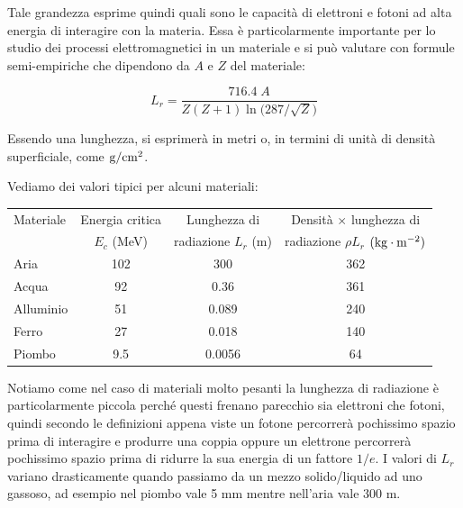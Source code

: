 Tale grandezza esprime quindi quali sono le capacità di elettroni e fotoni ad alta energia di interagire con la materia. Essa è particolarmente importante per lo studio dei processi elettromagnetici in un materiale e si può valutare con formule semi-empiriche che dipendono da $A$ e $Z$ del materiale:

\begin{equation*}
    L_r=\frac{716.4 \; A}{Z(Z+1)\ln \bigl( 287/\sqrt{Z} \bigr)}
\end{equation*}

Essendo una lunghezza, si esprimerà in metri o, in termini di unità di densità superficiale, come $\rm g/cm^2$.

Vediamo dei valori tipici per alcuni materiali:

\begin{center}
    \begin{tabular}{|l|c|c|c|}
      \hline
      Materiale & Energia critica & Lunghezza di & Densità $\times$ lunghezza di\\
      & $E_c$ (MeV) & radiazione $L_r$ (m) & radiazione $\rho L_r$ $(\rm kg \cdot m^{-2})$\\
      \hline
      Aria & 102 & 300 & 362\\
      \hline
      Acqua & 92 & 0.36 & 361\\
      \hline
      Alluminio & 51 & 0.089 & 240\\
      \hline
      Ferro & 27 & 0.018 & 140\\
      \hline
      Piombo & 9.5 & 0.0056 & 64\\
      \hline
    \end{tabular}
  \end{center}

Notiamo come nel caso di materiali molto pesanti la lunghezza di radiazione è particolarmente piccola perché questi frenano parecchio sia elettroni che fotoni, quindi secondo le definizioni appena viste un fotone percorrerà pochissimo spazio prima di interagire e produrre una coppia oppure un elettrone percorrerà pochissimo spazio prima di ridurre la sua energia di un fattore $1/e$. I valori di $L_r$ variano drasticamente quando passiamo da un mezzo solido/liquido ad uno gassoso, ad esempio nel piombo vale 5 mm mentre nell'aria vale 300 m.


